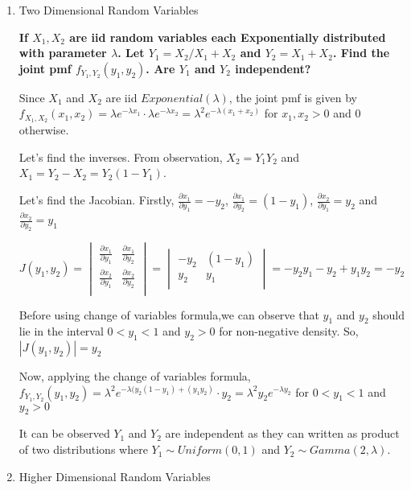 \documentclass[12pt, oneside]{article}
\begin{document}
\begin{enumerate}
\item Two Dimensional Random Variables

\noindent \textbf{ If $X_1,X_2$ are iid random variables each Exponentially distributed with parameter $\lambda$. Let $Y_1 = X_2/X_1 + X_2$ and $Y_2 = X_1+X_2$. Find the joint pmf $f_{Y_1,Y_2}(y_1,y_2)$. Are $Y_1$ and $Y_2$ independent?}

Since $X_1$ and $X_2$ are iid $Exponential(\lambda)$, the joint pmf is given by $f_{X_1,X_2}(x_1,x_2) = \lambda e^{-\lambda x_1} \cdot \lambda e^{-\lambda x_2} = \lambda^2 e^{-\lambda (x_1+x_2)}$ for $x_1,x_2>0$ and 0 otherwise.

Let's find the inverses. From observation, $X_2=Y_1Y_2$ and $X_1 = Y_2 - X_2 = Y_2(1-Y_1)$.

Let's find the Jacobian. 
Firstly, $\frac{\partial x_1}{\partial y_1} = -y_2$, $\frac{\partial x_1}{\partial y_2} = (1-y_1)$, $\frac{\partial x_2}{\partial y_1} = y_2$ and $\frac{\partial x_2}{\partial y_2} = y_1$ 

$J(y_1,y_2)  =
\begin{vmatrix}
\frac{\partial x_1}{\partial y_1} & \frac{\partial x_1}{\partial y_2} \\
\frac{\partial x_2}{\partial y_1} & \frac{\partial x_2}{\partial y_2} \\
\end{vmatrix}
=
\begin{vmatrix}
-y_2 & (1-y_1) \\
y_2 & y_1 \\
\end{vmatrix}
= -y_2y_1 - y_2 + y_1y_2 = -y_2$


Before using change of variables formula,we can observe that $y_1$ and $y_2$ should lie in the interval $0<y_1<1$ and $y_2>0$ for non-negative density. So,  $|J(y_1,y_2)| = y_2$ 

Now, applying the change of variables formula, 
$f_{Y_1,Y_2}(y_1,y_2) = \lambda^2 e^{-\lambda (y_2(1-y_1)+(y_1y_2)}\cdot y_2 = \lambda^2 y_2 e^{-\lambda y_2} $ for $0<y_1<1$ and $y_2>0$

It can be observed $Y_1$ and $Y_2$ are independent as they can written as product of two distributions where $Y_1 \sim Uniform(0,1)$ and $Y_2 \sim Gamma(2,\lambda)$.


\item Higher Dimensional Random Variables


\end{enumerate}
\end{document}
